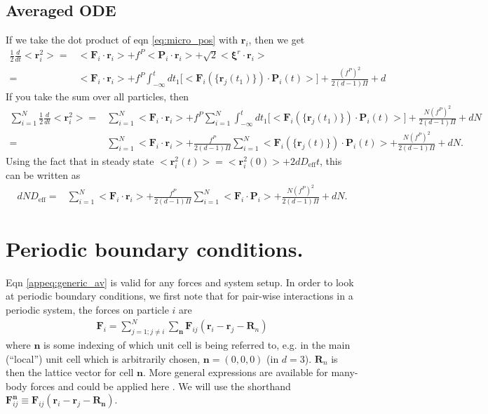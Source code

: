 \documentclass[twocolumn,amsmath,amssymb,aps]{revtex4-1}%
\begin{document}
\begin{widetext}
\subsection{Averaged ODE}
If we take the dot product of eqn \ref{eq:micro_pos} with $\bm{r}_i$,
then we get
\begin{align}
  \frac{1}{2}\frac{d}{dt}<\bm{r}_i^2>
  =& <\bm{F}_i\cdot\bm{r}_i>+f^P<\bm{P}_i\cdot\bm{r}_i>
  +\sqrt{2}<\bm{\xi}^r\cdot\bm{r}_i>\nonumber\\
  =& <\bm{F}_i\cdot\bm{r}_i>
  +f^P\int_{-\infty}^tdt_1\big[<\bm{F}_i(\{\bm{r}_j(t_1)\})
    \cdot\bm{P}_i(t)>\big]+\frac{(f^P)^2}{2(d-1)\Pi}
  +d
\end{align}
If you take the sum over all particles, then
\begin{align}
  \sum_{i=1}^N\frac{1}{2}\frac{d}{dt}<\bm{r}_i^2>
  =&\sum_{i=1}^N <\bm{F}_i\cdot\bm{r}_i>
  +f^P\sum_{i=1}^N\int_{-\infty}^tdt_1\big[<\bm{F}_i(\{\bm{r}_j(t_1)\})
    \cdot\bm{P}_i(t)>\big]+\frac{N(f^P)^2}{2(d-1)\Pi}
  +dN\nonumber\\
  =&\sum_{i=1}^N <\bm{F}_i\cdot\bm{r}_i>
  +\frac{f^P}{2(d-1)\Pi}\sum_{i=1}^N<\bm{F}_i(\{\bm{r}_j(t)\})
    \cdot\bm{P}_i(t)>+\frac{N(f^P)^2}{2(d-1)\Pi}
  +dN.
\end{align}
Using the fact that in steady state
$<\bm{r}_i^2(t)>=<\bm{r}_i^2(0)>+2dD_{\mathrm{eff}}t$, this can be written as
\begin{align}\label{appeq:generic_av}
  dND_{\mathrm{eff}}
  =&\sum_{i=1}^N <\bm{F}_i\cdot\bm{r}_i>
  +\frac{f^P}{2(d-1)\Pi}\sum_{i=1}^N<\bm{F}_i
    \cdot\bm{P}_i>+\frac{N(f^P)^2}{2(d-1)\Pi}
  +dN.
\end{align}

\section{Periodic boundary conditions.}
Eqn \ref{appeq:generic_av} is valid for any forces and system setup. In order to
look at periodic boundary conditions, we first note that for pair-wise
interactions in a periodic system, the forces on particle $i$ are
\begin{align}
  \bm{F}_i = \sum_{j=1;j\neq i}^N\sum_{\bm{n}}
  \bm{F}_{ij}(\bm{r}_i-\bm{r}_j-\bm{R}_n)
\end{align}
where $\bm{n}$ is some indexing of which unit cell is being referred to,
e.g. in the main (``local'') unit cell which is arbitrarily chosen,
$\bm{n}=(0,0,0)$ (in $d=3$). $\bm{R}_n$ is then the lattice vector for
cell $\bm{n}$. More general expressions are available for many-body forces
and could be applied here \cite{doi:10.1063/1.3245303}.
We will use the shorthand
$\bm{F}_{ij}^{\bm{n}}\equiv\bm{F}_{ij}(\bm{r}_i-\bm{r}_j-\bm{R}_{\bm{n}})$.


\end{widetext}
\end{document}
